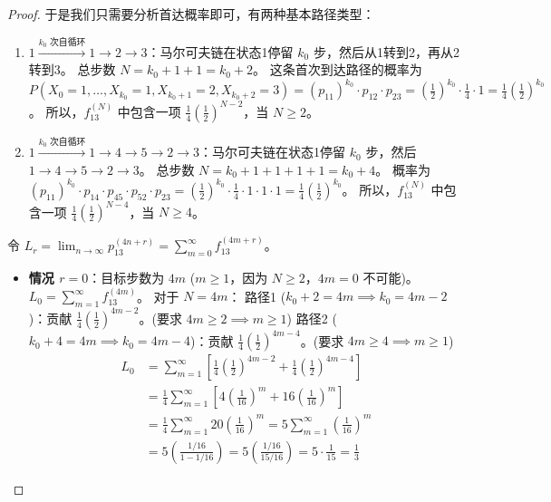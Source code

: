 \documentclass[lang=cn,10pt,thmcnt=section]{elegantbook}
\begin{document}
\begin{proof}
于是我们只需要分析首达概率即可，有两种基本路径类型：
\begin{enumerate}
    \item $1 \xrightarrow{k_0 \text{ 次自循环}} 1 \to 2 \to 3$：马尔可夫链在状态1停留 $k_0$ 步，然后从1转到2，再从2转到3。
    总步数 $N = k_0+1+1 = k_0+2$。
    这条首次到达路径的概率为 $P(X_0=1, \dots, X_{k_0}=1, X_{k_0+1}=2, X_{k_0+2}=3) = (p_{11})^{k_0} \cdot p_{12} \cdot p_{23} = \left(\frac{1}{2}\right)^{k_0} \cdot \frac{1}{4} \cdot 1 = \frac{1}{4} \left(\frac{1}{2}\right)^{k_0}$。
    所以，$f_{13}^{(N)}$ 中包含一项 $\frac{1}{4} \left(\frac{1}{2}\right)^{N-2}$，当 $N \ge 2$。

    \item $1 \xrightarrow{k_0 \text{ 次自循环}} 1 \to 4 \to 5 \to 2 \to 3$：马尔可夫链在状态1停留 $k_0$ 步，然后 $1 \to 4 \to 5 \to 2 \to 3$。
    总步数 $N = k_0+1+1+1+1 = k_0+4$。
    概率为 $(p_{11})^{k_0} \cdot p_{14} \cdot p_{45} \cdot p_{52} \cdot p_{23} = \left(\frac{1}{2}\right)^{k_0} \cdot \frac{1}{4} \cdot 1 \cdot 1 \cdot 1 = \frac{1}{4} \left(\frac{1}{2}\right)^{k_0}$。
    所以，$f_{13}^{(N)}$ 中包含一项 $\frac{1}{4} \left(\frac{1}{2}\right)^{N-4}$，当 $N \ge 4$。
\end{enumerate}

令 $L_r = \lim_{n \to \infty} p_{13}^{(4n+r)} = \sum_{m=0}^{\infty} f_{13}^{(4m+r)}$。

\begin{itemize}
    \item \textbf{情况 $r=0$}：目标步数为 $4m$ ($m \ge 1$，因为 $N \ge 2$，$4m=0$ 不可能)。
    $L_0 = \sum_{m=1}^{\infty} f_{13}^{(4m)}$。
    对于 $N=4m$：
    路径1 ($k_0+2 = 4m \implies k_0=4m-2$)：贡献 $\frac{1}{4}\left(\frac{1}{2}\right)^{4m-2}$。(要求 $4m \ge 2 \implies m \ge 1$)
    路径2 ($k_0+4 = 4m \implies k_0=4m-4$)：贡献 $\frac{1}{4}\left(\frac{1}{2}\right)^{4m-4}$。(要求 $4m \ge 4 \implies m \ge 1$)
    \begin{align*} L_0 &= \sum_{m=1}^{\infty} \left[ \frac{1}{4}\left(\frac{1}{2}\right)^{4m-2} + \frac{1}{4}\left(\frac{1}{2}\right)^{4m-4} \right] \\ &= \frac{1}{4} \sum_{m=1}^{\infty} \left[ 4\left(\frac{1}{16}\right)^m + 16\left(\frac{1}{16}\right)^m \right] \\ &= \frac{1}{4} \sum_{m=1}^{\infty} 20\left(\frac{1}{16}\right)^m = 5 \sum_{m=1}^{\infty} \left(\frac{1}{16}\right)^m \\ &= 5 \left( \frac{1/16}{1 - 1/16} \right) = 5 \left( \frac{1/16}{15/16} \right) = 5 \cdot \frac{1}{15} = \frac{1}{3} \end{align*}


\end{itemize}
\end{proof}
\end{document}
